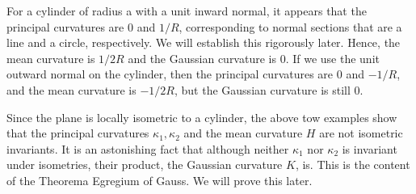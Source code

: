 \begin{example}
For a cylinder of radius a with a unit inward normal, it appears that the principal curvatures are $0$ and $1/R$, corresponding to normal sections that are a line and 
a circle, respectively. We will establish this rigorously later. Hence, the mean curvature is $1/2R$ and the Gaussian curvature is $0$. If we use the unit outward normal 
on the cylinder, then the principal curvatures are $0$ and $-1/R$, and the mean curvature is $-1/2R$, but the Gaussian curvature is still $0$.
\end{example}
Since the plane is locally isometric to a cylinder, the above tow examples show that the principal curvatures $\kappa_1,\kappa_2$ and the mean curvature $H$ are not 
isometric invariants. It is an astonishing fact that although neither $\kappa_1$ nor $\kappa_2$ is invariant under isometries, their product, the Gaussian curvature 
$K$, is. This is the content of the Theorema Egregium of Gauss. We will prove this later.
